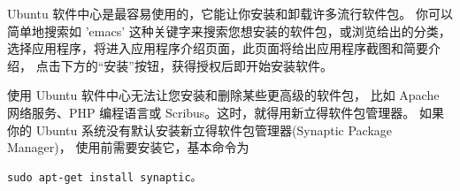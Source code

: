 Ubuntu 软件中心是最容易使用的，它能让你安装和卸载许多流行软件包。
你可以简单地搜索如 'emacs' 这种关键字来搜索您想安装的软件包，或浏览给出的分类，
选择应用程序，将进入应用程序介绍页面，此页面将给出应用程序截图和简要介绍，
点击下方的“安装”按钮，获得授权后即开始安装软件。
\begin{figure}[htbp]
	\centering
	\hfill
	\label{fig:Software}
\end{figure}

使用 Ubuntu 软件中心无法让您安装和删除某些更高级的软件包，
比如 Apache 网络服务、PHP 编程语言或 Scribus。这时，就得用新立得软件包管理器。
如果你的 Ubuntu 系统没有默认安装新立得软件包管理器(Synaptic Package Manager)，
使用前需要安装它，基本命令为
\begin{verbatim}
sudo apt-get install synaptic。
\end{verbatim}

